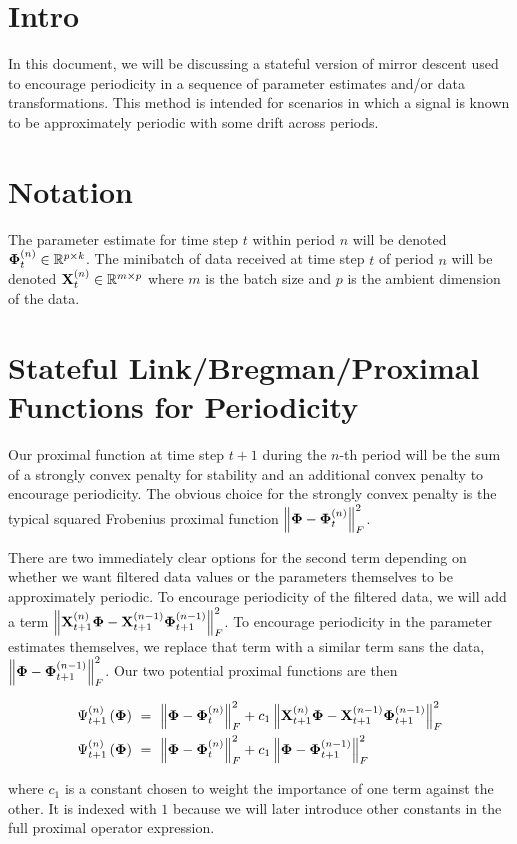 \documentclass{article}
\begin{document}
	\section{Intro}
	In this document, we will be discussing a stateful version of mirror descent used to encourage periodicity in a sequence of parameter estimates and/or data transformations. This method is intended for scenarios in which a signal is known to be approximately periodic with some drift across periods. 

	\section{Notation}
	The parameter estimate for time step $t$ within period $n$ will be denoted $\mathbf{\Phi}_t^{(n)} \in \mathbb{R}^{p \times k}$. The minibatch of data received at time step $t$ of period $n$ will be denoted $\mathbf{X}_t^{(n)} \in \mathbb{R}^{m \times p}$ where $m$ is the batch size and $p$ is the ambient dimension of the data.

	\section{Stateful Link/Bregman/Proximal Functions for Periodicity}
	Our proximal function at time step $t+1$ during the $n$-th period will be the sum of a strongly convex penalty for stability and an additional convex penalty to encourage periodicity. The obvious choice for the strongly convex penalty is the typical squared Frobenius proximal function $\left\lVert\mathbf{\Phi} - \mathbf{\Phi}_t^{(n)}\right\rVert_F^2$. 
	
	There are two immediately clear options for the second term depending on whether we want filtered data values or the parameters themselves to be approximately periodic. To encourage periodicity of the filtered data, we will add a term $\left\lVert\mathbf{X}_{t+1}^{(n)}\mathbf{\Phi} - \mathbf{X}_{t+1}^{(n-1)}\mathbf{\Phi}_{t+1}^{(n-1)}\right\rVert_F^2$. To encourage periodicity in the parameter estimates themselves, we replace that term with a similar term sans the data, $\left\lVert\mathbf{\Phi} - \mathbf{\Phi}_{t+1}^{(n-1)}\right\rVert_F^2$. Our two potential proximal functions are then
	
	\begin{align}
		\Psi_{t+1}^{(n)} \left( \mathbf{\Phi} \right)\ &=\ \left\lVert\mathbf{\Phi} - \mathbf{\Phi}_t^{(n)}\right\rVert_F^2 + c_1 \left\lVert\mathbf{X}_{t+1}^{(n)}\mathbf{\Phi} - \mathbf{X}_{t+1}^{(n-1)}\mathbf{\Phi}_{t+1}^{(n-1)}\right\rVert_F^2\\
		\Psi_{t+1}^{(n)} \left( \mathbf{\Phi} \right)\ &=\ \left\lVert\mathbf{\Phi} - \mathbf{\Phi}_t^{(n)}\right\rVert_F^2 + c_1 \left\lVert\mathbf{\Phi} - \mathbf{\Phi}_{t+1}^{(n-1)}\right\rVert_F^2
	\end{align}
	
	\noindent where $c_1$ is a constant chosen to weight the importance of one term against the other. It is indexed with $1$ because we will later introduce other constants in the full proximal operator expression.
    
	
	
\end{document}
